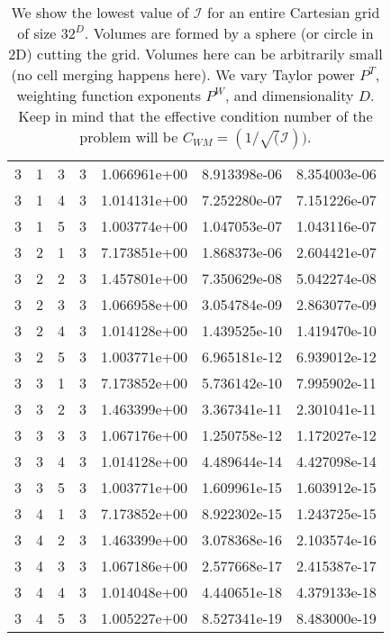 \documentclass{article}
\newcommand{\cali}{\mathcal{I}}
\begin{document}
\begin{small}
\begin{table}
\begin{center}
\begin{tabular}{|cccc|ccc|}
3 & 1 & 3 & 3 & 1.066961e+00 & 8.913398e-06 & 8.354003e-06 \\ 
3 & 1 & 4 & 3 & 1.014131e+00 & 7.252280e-07 & 7.151226e-07 \\ 
3 & 1 & 5 & 3 & 1.003774e+00 & 1.047053e-07 & 1.043116e-07 \\ 
\hline
3 & 2 & 1 & 3 & 7.173851e+00 & 1.868373e-06 & 2.604421e-07 \\ 
3 & 2 & 2 & 3 & 1.457801e+00 & 7.350629e-08 & 5.042274e-08 \\ 
3 & 2 & 3 & 3 & 1.066958e+00 & 3.054784e-09 & 2.863077e-09 \\ 
3 & 2 & 4 & 3 & 1.014128e+00 & 1.439525e-10 & 1.419470e-10 \\ 
3 & 2 & 5 & 3 & 1.003771e+00 & 6.965181e-12 & 6.939012e-12 \\ 
\hline
3 & 3 & 1 & 3 & 7.173852e+00 & 5.736142e-10 & 7.995902e-11 \\ 
3 & 3 & 2 & 3 & 1.463399e+00 & 3.367341e-11 & 2.301041e-11 \\ 
3 & 3 & 3 & 3 & 1.067176e+00 & 1.250758e-12 & 1.172027e-12 \\ 
3 & 3 & 4 & 3 & 1.014128e+00 & 4.489644e-14 & 4.427098e-14 \\ 
3 & 3 & 5 & 3 & 1.003771e+00 & 1.609961e-15 & 1.603912e-15 \\ 
\hline
3 & 4 & 1 & 3 & 7.173852e+00 & 8.922302e-15 & 1.243725e-15 \\ 
3 & 4 & 2 & 3 & 1.463399e+00 & 3.078368e-16 & 2.103574e-16 \\ 
3 & 4 & 3 & 3 & 1.067186e+00 & 2.577668e-17 & 2.415387e-17 \\ 
3 & 4 & 4 & 3 & 1.014048e+00 & 4.440651e-18 & 4.379133e-18 \\ 
3 & 4 & 5 & 3 & 1.005227e+00 & 8.527341e-19 & 8.483000e-19 \\
\hline
\end{tabular}
\end{center}
\label{tab::worst_unmerged_inv_conv}
\caption
    {
      We show the lowest value of
      $\cali$ for an entire Cartesian grid of size $32^D$.
      Volumes are  formed by a sphere (or circle in 2D) cutting the
      grid.   Volumes here can be arbitrarily small (no cell merging
      happens here).
      We vary Taylor power $P^T$, weighting
      function exponents $P^W$, and dimensionality $D$. 
      Keep in mind
      that the effective condition number of the problem will be 
      $C_{WM} = (1/\sqrt(\cali))$.
    }
\end{table}
\end{small}
\end{document}
